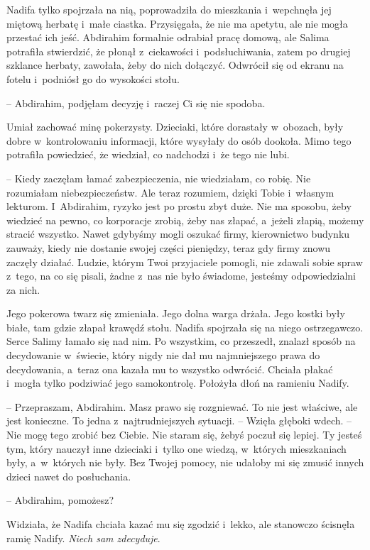 \documentclass[oneside,polish,11pt,sfheadings]{mwbk}
\begin{document}
Nadifa tylko spojrzała na nią, poprowadziła do mieszkania i~wepchnęła
jej miętową herbatę i~małe ciastka. Przysięgała, że nie ma apetytu, ale
nie mogła przestać ich jeść. Abdirahim formalnie odrabiał pracę domową,
ale Salima potrafiła stwierdzić, że płonął z~ciekawości i~podsłuchiwania, zatem po drugiej szklance herbaty, zawołała, żeby do
nich dołączyć. Odwrócił się od ekranu na fotelu i~podniósł go do
wysokości stołu.

-- Abdirahim, podjęłam decyzję i~raczej Ci się nie spodoba.

Umiał zachować minę pokerzysty. Dzieciaki, które dorastały w~obozach,
były dobre w~kontrolowaniu informacji, które wysyłały do osób dookoła.
Mimo tego potrafiła powiedzieć, że wiedział, co nadchodzi i~że tego nie
lubi.

-- Kiedy zaczęłam łamać zabezpieczenia, nie wiedziałam, co robię. Nie
rozumiałam niebezpieczeństw. Ale teraz rozumiem, dzięki Tobie i~własnym
lekturom. I~Abdirahim, ryzyko jest po prostu zbyt duże. Nie ma sposobu,
żeby wiedzieć na pewno, co korporacje zrobią, żeby nas złapać, a~jeżeli
złapią, możemy stracić wszystko. Nawet gdybyśmy mogli oszukać firmy,
kierownictwo budynku zauważy, kiedy nie dostanie swojej części
pieniędzy, teraz gdy firmy znowu zaczęły działać. Ludzie, którym Twoi
przyjaciele pomogli, nie zdawali sobie spraw z~tego, na co się pisali,
żadne z~nas nie było świadome, jesteśmy odpowiedzialni za nich.

Jego pokerowa twarz się zmieniała. Jego dolna warga drżała. Jego kostki
były białe, tam gdzie złapał krawędź stołu. Nadifa spojrzała się na
niego ostrzegawczo. Serce Salimy łamało się nad nim. Po wszystkim, co
przeszedł, znalazł sposób na decydowanie w~świecie, który nigdy nie dał
mu najmniejszego prawa do decydowania, a~teraz ona kazała mu to wszystko
odwrócić. Chciała płakać i~mogła tylko podziwiać jego samokontrolę.
Położyła dłoń na ramieniu Nadify.

-- Przepraszam, Abdirahim. Masz prawo się rozgniewać. To nie jest
właściwe, ale jest konieczne. To jedna z~najtrudniejszych sytuacji. -- Wzięła głęboki wdech. -- Nie mogę tego zrobić bez Ciebie. Nie staram się,
żebyś poczuł się lepiej. Ty jesteś tym, który nauczył inne dzieciaki i~tylko one wiedzą, w~których mieszkaniach były, a~w~których nie były. Bez
Twojej pomocy, nie udałoby mi się zmusić innych dzieci nawet do
posłuchania.

-- Abdirahim, pomożesz?

Widziała, że Nadifa chciała kazać mu się zgodzić i~lekko, ale stanowczo
ścisnęła ramię Nadify. \textit{Niech sam zdecyduje}.
\end{document}
